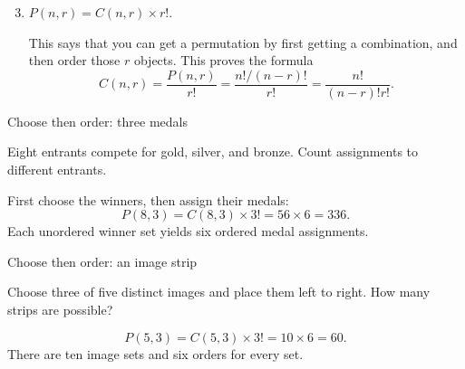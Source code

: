 \begin{frame}
\begin{prop}{}{}
\begin{enumerate} \setcounter{enumi}{2}
\item $P(n,r) = C(n,r) \times r!$. \begin{slide} This says that you can get a permutation by first getting a combination, and then order those $r$ objects. This proves the formula
\[ C(n,r) = \frac{P(n,r)}{r!} = \frac{n!/(n-r)!}{r!} = \frac{n!}{(n-r)!r!}. \] \end{slide}
\end{enumerate}
\end{prop}
\end{frame}
\begin{frame}[t]{Choose then order: three medals}
\small
\begin{ex}
Eight entrants compete for gold, silver, and bronze. Count assignments to different entrants.
\end{ex}
\begin{sol}
First choose the winners, then assign their medals:\[P(8,3)=C(8,3)\times3!=56\times6=336.\] Each unordered winner set yields six ordered medal assignments.
\end{sol}
\end{frame}

\begin{frame}[t]{Choose then order: an image strip}
\small
\begin{ex}
Choose three of five distinct images and place them left to right. How many strips are possible?
\end{ex}
\begin{sol}
\[P(5,3)=C(5,3)\times3!=10\times6=60.\] There are ten image sets and six orders for every set.
\end{sol}
\end{frame}
